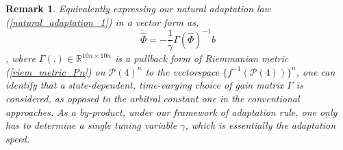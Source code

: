 \documentclass[letterpaper, 10 pt, conference]{ieeeconf}  %
\newtheorem{remark}{Remark}
\begin{document}
\begin{remark}
Equivalently expressing our natural adaptation law (\ref{natural_adaptation_1}) in a vector form as,
\begin{equation}
\dot{\hat{\Phi}} = -\frac{1}{\gamma} \Gamma(\hat{\Phi})^{-1}b
\end{equation}
, where $\Gamma(.)\in\mathbb{R}^{10n\times10n}$ is a pullback form of Riemmanian metric (\ref{riem_metric_Pn}) on $\mathcal{P}(4)^n$ to the vectorspace $\{f^{-1}(\mathcal{P}(4))\}^n$, one can identify that a state-dependent, time-varying choice of gain matrix $\Gamma$ is considered, as opposed to the arbitral constant one in the conventional approaches. As a by-product, under our framework of adaptation rule, one only has to determine a single tuning variable $\gamma$, which is essentially the adaptation speed.
\end{remark}


\end{document}
